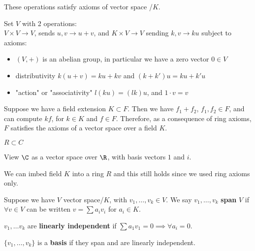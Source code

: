 \documentclass[10pt]{article}
\begin{document}
These operations satisfy axioms of vector space /$K$. 

Set $V$ with 2 operations: \\
$V\times V \to V$, sends $u, v \to u + v$, and $K \times V \to V$ sending $k, v \to ku$ subject to axioms:
\begin{itemize}
    \item $(V, +)$ is an abelian group, in particular we have a zero vector $0 \in V$
    \item distributivity $k(u + v) = ku + kv$ and $(k + k')u = ku + k'u$
    \item "action" or "associativity" $l(ku) = (lk)u$, and $1 \cdot v = v$
\end{itemize}

\begin{exm*}
    Suppose we have a field extension $K \subset F$. Then we have $f_1 + f_2$, $f_1, f_2 \in F$, and can compute $kf$, for $k \in K$ and $f\in F$. Therefore, as a consequence of ring axioms, $F$ satisfies the axioms of a vector space over a field $K$. 
\end{exm*}

\begin{exm*}
    $R \subset C$
\end{exm*}
View $\C$ as a vector space over $\R$, with basis vectors $1$ and $i$.

\begin{rmk}
    We can imbed field $K$ into a ring $R$ and this still holds since we used ring axioms only.
\end{rmk}

\begin{defn}
    Suppose we have $V$ vector space/$K$, with $v_1, \ldots, v_k \in V$. We say $v_1, \ldots, v_k$ \textbf{span} $V$ if $\forall v \in V$ can be written $v = \sum a_iv_i$ for $a_i \in K$.
\end{defn}

\begin{defn}
    $v_1, \ldots v_k$ are \textbf{linearly independent} if $\sum a_1 v_1 = 0 \implies \forall a_i = 0$.
\end{defn}

\begin{defn}
    $\{v_1, \ldots, v_k\}$ is a \textbf{basis} if they span and are linearly independent.
\end{defn}
\end{document}
